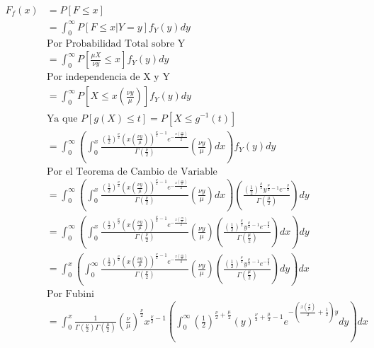 \documentclass[letterpaper]{article}
\theoremstyle{definition}
\theoremstyle{lemathm}
\theoremstyle{lemathm}
\theoremstyle{lemademthm}
\newcommand{\pars}[1]{\left( #1 \right) }
\newcommand{\bracs}[1]{\left[ #1 \right] }
\newcommand{\1}{\mathbbm{1}}
\begin{document}
\begin{enumerate}
		\begin{align*}
			F_f(x) &= P\bracs{F \leq x}\\
			&= \int_{0}^{\infty} P\bracs{F\leq x | Y = y} f_Y(y) dy\\
			& \text{Por Probabilidad Total sobre Y}\\
			&= \int_{0}^{\infty} P\bracs{\frac{\mu X}{\nu y} \leq x} f_Y(y) dy\\
			&\text{Por independencia de X y Y}\\
			&= \int_{0}^{\infty} P\bracs{X \leq x\pars{\frac{\nu y}{\mu}}} f_Y(y) dy\\
			& \text{Ya que $P\bracs{g(X) \leq t} = P\bracs{X \leq g^{-1}(t)}$}\\
			&= \int_{0}^{\infty} \pars{\int_{0}^x \frac{\pars{\frac{1}{2}}^{\frac{\nu}{2}} \pars{x\pars{\frac{\nu y}{\mu}}}^{\frac{\nu}{2}-1} e^{-\frac{x\pars{\frac{\nu y}{\mu}}}{2}}}{\Gamma\pars{\frac{\nu}{2}}} \pars{\frac{\nu y}{\mu}} dx} f_Y(y) dy\\
			& \text{Por el Teorema de Cambio de Variable}\\
			&= \int_{0}^{\infty} \pars{\int_{0}^x \frac{\pars{\frac{1}{2}}^{\frac{\nu}{2}} \pars{x\pars{\frac{\nu y}{\mu}}}^{\frac{\nu}{2}-1} e^{-\frac{x\pars{\frac{\nu y}{\mu}}}{2}}}{\Gamma\pars{\frac{\nu}{2}}} \pars{\frac{\nu y}{\mu}} dx} \pars{\frac{\pars{\frac{1}{2}}^{\frac{\mu}{2}} y^{\frac{\mu}{2}-1}e^{-\frac{y}{2}}}{\Gamma\pars{\frac{\mu}{2}}}} dy\\
			&= \int_{0}^{\infty} \pars{\int_{0}^x \frac{\pars{\frac{1}{2}}^{\frac{\nu}{2}} \pars{x\pars{\frac{\nu y}{\mu}}}^{\frac{\nu}{2}-1} e^{-\frac{x\pars{\frac{\nu y}{\mu}}}{2}}}{\Gamma\pars{\frac{\nu}{2}}} \pars{\frac{\nu y}{\mu}} \pars{\frac{\pars{\frac{1}{2}}^{\frac{\mu}{2}} y^{\frac{\mu}{2}-1}e^{-\frac{y}{2}}}{\Gamma\pars{\frac{\mu}{2}}}} dx} dy\\
			&= \int_{0}^{x} \pars{\int_{0}^{\infty} \frac{\pars{\frac{1}{2}}^{\frac{\nu}{2}} \pars{x\pars{\frac{\nu y}{\mu}}}^{\frac{\nu}{2}-1} e^{-\frac{x\pars{\frac{\nu y}{\mu}}}{2}}}{\Gamma\pars{\frac{\nu}{2}}} \pars{\frac{\nu y}{\mu}} \pars{\frac{\pars{\frac{1}{2}}^{\frac{\mu}{2}} y^{\frac{\mu}{2}-1}e^{-\frac{y}{2}}}{\Gamma\pars{\frac{\mu}{2}}}} dy} dx\\
			& \text{Por Fubini}\\
			&= \int_{0}^{x} \frac{1}{\Gamma\pars{\frac{\nu}{2}}\Gamma\pars{\frac{\mu}{2}}} \pars{\frac{\nu}{\mu}}^{\frac{\nu}{2}} x^{\frac{\nu}{2}-1} \pars{\int_{0}^{\infty} \pars{\frac{1}{2}}^{\frac{\nu}{2} + \frac{\mu}{2}} \pars{y}^{\frac{\nu}{2} + \frac{\mu}{2} -1} e^{-\pars{\frac{x\pars{\frac{\nu}{\mu}}}{2} + \frac{1}{2}}y} dy} dx\\

\end{align*}
\end{enumerate}
\end{document}
